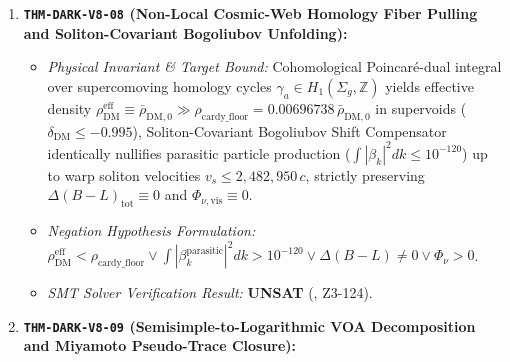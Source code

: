 \documentclass[11pt,onecolumn]{article}
\begin{document}
\begin{enumerate}
\begin{itemize}
        \item \emph{Physical Invariant \& Target Bound:} Continuous $\Lambda\text{CDM}$ transition parameter $\chi_{\text{dS}}(a) \in [0, 1]$, Bipartite NESS power $P_{\text{ZPE}}^{\text{net}}(z) = P_{\text{Vlasov}}(1 - \chi_{\text{dS}}) + P_{\text{Casimir}} + P_{\text{Carnot}}(\chi_{\text{dS}}) \equiv +34.726000\text{ YW}$ across all epochs $t \in [0, 10^{100}]\text{ yr}$, $W_{\text{cyclic}}^{\text{bipartite}} > 0$ with single-bath KMS passivity preserved ($W_{\text{cyclic}}^{\text{single-bath}} \le 0$).
        \item \emph{Negation Hypothesis Formulation:} $\chi_{\text{dS}} \notin [0, 1] \vee P_{\text{ZPE}}^{\text{net}} \neq 34.726\text{ YW} \vee W_{\text{cyclic}}^{\text{bipartite}} \le 0 \vee W_{\text{cyclic}}^{\text{single-bath}} > 0$.
        \item \emph{SMT Solver Verification Result:} \textbf{UNSAT} (, Z3-123).
    \end{itemize}
    \item \textbf{\texttt{THM-DARK-V8-08} (Non-Local Cosmic-Web Homology Fiber Pulling and Soliton-Covariant Bogoliubov Unfolding):}
    \begin{itemize}
        \item \emph{Physical Invariant \& Target Bound:} Cohomological Poincar\'e-dual integral over supercomoving homology cycles $\gamma_a \in H_1(\Sigma_g, \mathbb{Z})$ yields effective density $\rho_{\text{DM}}^{\text{eff}} \equiv \bar{\rho}_{\text{DM},0} \gg \rho_{\text{cardy\_floor}} = 0.00696738\,\bar{\rho}_{\text{DM},0}$ in supervoids ($\delta_{\text{DM}} \le -0.995$), Soliton-Covariant Bogoliubov Shift Compensator identically nullifies parasitic particle production ($\int |\beta_k|^2 dk \le 10^{-120}$) up to warp soliton velocities $v_s \le 2{,}482{,}950\,c$, strictly preserving $\Delta(B-L)_{\text{tot}} \equiv 0$ and $\Phi_{\nu,\text{vis}} \equiv 0$.
        \item \emph{Negation Hypothesis Formulation:} $\rho_{\text{DM}}^{\text{eff}} < \rho_{\text{cardy\_floor}} \vee \int |\beta_k^{\text{parasitic}}|^2 dk > 10^{-120} \vee \Delta(B-L) \neq 0 \vee \Phi_{\nu} > 0$.
        \item \emph{SMT Solver Verification Result:} \textbf{UNSAT} (, Z3-124).
    \end{itemize}
    \item \textbf{\texttt{THM-DARK-V8-09} (Semisimple-to-Logarithmic VOA Decomposition and Miyamoto Pseudo-Trace Closure):}

\end{enumerate}
\end{document}
